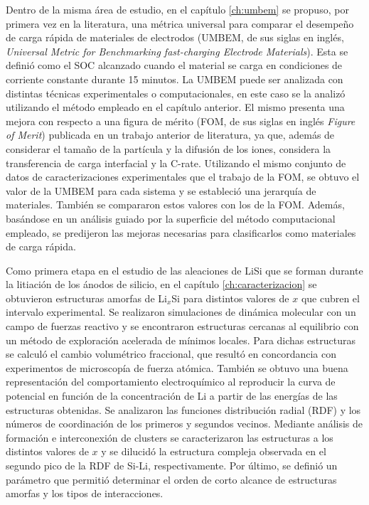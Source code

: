 Dentro de la misma área de estudio, en el capítulo \ref{ch:umbem} se propuso, por 
primera vez en la literatura, una métrica universal para comparar el desempeño de 
carga rápida de materiales de electrodos (UMBEM, de sus siglas en inglés, 
\textit{Universal Metric for Benchmarking fast-charging Electrode Materials}). 
Esta se definió como el SOC alcanzado cuando el material se carga 
en condiciones de corriente constante durante 15 minutos. La UMBEM puede ser 
analizada con distintas técnicas experimentales o computacionales, en este caso 
se la analizó utilizando el método empleado en el capítulo anterior. El mismo 
presenta una mejora con respecto a una figura de mérito (FOM, de sus siglas en 
inglés \textit{Figure of Merit}) publicada en un trabajo anterior de literatura,
ya que, además de considerar el tamaño de la partícula y la difusión de los iones, 
considera la transferencia de carga interfacial y la C-rate. Utilizando el mismo 
conjunto de datos de caracterizaciones experimentales que el trabajo de la FOM, se
obtuvo el valor de la UMBEM para cada sistema y se estableció una jerarquía de 
materiales. También se compararon estos valores con los de la FOM. Además,
basándose en un análisis guiado por la superficie del método computacional 
empleado, se predijeron las mejoras necesarias para clasificarlos 
como materiales de carga rápida.

Como primera etapa en el estudio de las aleaciones de LiSi que se forman durante
la litiación de los ánodos de silicio, en el capítulo \ref{ch:caracterizacion} se 
obtuvieron estructuras amorfas de Li$_x$Si para distintos valores de $x$ que 
cubren el intervalo experimental. Se realizaron simulaciones de 
dinámica molecular con un campo de fuerzas reactivo y se encontraron estructuras
cercanas al equilibrio con un método de exploración acelerada de mínimos locales.
Para dichas estructuras se calculó el cambio volumétrico fraccional, que resultó 
en concordancia con experimentos de microscopía de fuerza atómica. También se 
obtuvo una buena representación del comportamiento electroquímico al reproducir 
la curva de potencial en función de la concentración de Li a partir de las 
energías de las estructuras obtenidas. Se analizaron las funciones distribución 
radial (RDF) y los números de coordinación de los primeros y segundos vecinos. 
Mediante análisis de formación e interconexión de clusters se caracterizaron las 
estructuras a los distintos valores de $x$ y se dilucidó la estructura compleja 
observada en el segundo pico de la RDF de Si-Li, respectivamente. Por último, se 
definió un parámetro que permitió determinar el orden de corto alcance de 
estructuras amorfas y los tipos de interacciones.

